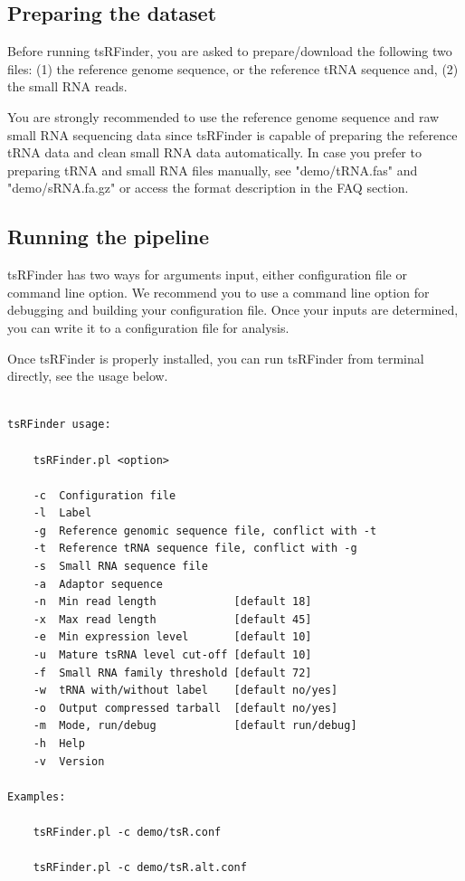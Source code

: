 \documentclass[11pt, a4paper]{article}
\begin{document}
\subsection{Preparing the dataset}

Before running tsRFinder, you are asked to prepare/download the following two files: (1) the reference genome sequence, or the reference tRNA sequence and, (2) the small RNA reads.

You are strongly recommended to use the reference genome sequence and raw small RNA sequencing data since tsRFinder is capable of preparing the reference tRNA data and clean small RNA data automatically. In case you prefer to preparing tRNA and small RNA files manually, see "demo/tRNA.fas" and "demo/sRNA.fa.gz" or access the format description in the FAQ section.

\subsection{Running the pipeline}

tsRFinder has two ways for arguments input, either configuration file or command line option. We recommend you to use a command line option for debugging and building your configuration file. Once your inputs are determined, you can write it to a configuration file for analysis.

Once tsRFinder is properly installed, you can run tsRFinder from terminal directly, see the usage below.

{\scriptsize \begin{tcolorbox}[colback=blue!5!white,colframe=blue!75!black,title=Usage of tsRFinder: ./tsRFinder.pl -h]
\begin{verbatim}

tsRFinder usage:

    tsRFinder.pl <option>

    -c  Configuration file
    -l  Label
    -g  Reference genomic sequence file, conflict with -t
    -t  Reference tRNA sequence file, conflict with -g
    -s  Small RNA sequence file
    -a  Adaptor sequence
    -n  Min read length            [default 18]
    -x  Max read length            [default 45]
    -e  Min expression level       [default 10]
    -u  Mature tsRNA level cut-off [default 10]
    -f  Small RNA family threshold [default 72]
    -w  tRNA with/without label    [default no/yes]
    -o  Output compressed tarball  [default no/yes]
    -m  Mode, run/debug            [default run/debug]
    -h  Help
    -v  Version

Examples:

    tsRFinder.pl -c demo/tsR.conf

    tsRFinder.pl -c demo/tsR.alt.conf
\end{verbatim}
\end{tcolorbox}}
\end{document}
